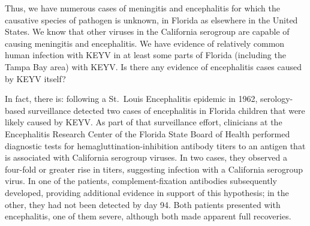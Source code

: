 \documentclass[12pt]{article}
\newcommand{\eg}{\textit{e.g.}}
\newcommand{\cjh}{\textcolor{blue}{cjh}}
\newcommand{\tjh}{\textcolor{red}{tjh}}
\newcommand{\jal}{\textcolor{green}{jal}}
\newcommand{\msg}[3]{(#1 $\rightarrow$ #2: #3)}
\newcommand{\mtc}[1]{\msg\tjh\cjh{#1}}
\newcommand{\mjc}[1]{\msg\jal\cjh{#1}}
\begin{document}
        

        Thus, we have numerous cases of meningitis and encephalitis for which the causative species of pathogen is unknown, in Florida as elsewhere in the United States. %
        We know that other viruses in the California serogroup are capable of causing meningitis and encephalitis.  We have evidence of relatively common human infection with KEYV in at least some parts of Florida (including the Tampa Bay area) with KEYV. Is there any evidence of encephalitis cases caused by KEYV itself?

        In fact, there is: following a St.\ Louis Encephalitis epidemic in 1962, serology-based surveillance detected two cases of encephalitis in Florida children that were likely caused by KEYV. As part of that surveillance effort, clinicians at the Encephalitis Research Center of the Florida State Board of Health performed diagnostic tests for hemagluttination-inhibition antibody titers to an antigen that is associated with California serogroup viruses. In two cases, they observed a four-fold or greater rise in titers, suggesting infection with a California serogroup virus. In one of the patients, complement-fixation antibodies subsequently developed, providing additional evidence in support of this hypothesis; in the other, they had not been detected by day 94. Both patients presented with encephalitis, one of them severe, although both made apparent full recoveries.\cite{bond1966california}
\end{document}
